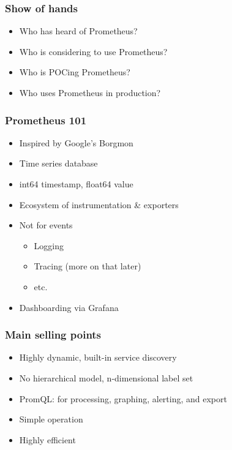 \documentclass[t]{beamer}
\begin{document}



\begin{frame}
	\frametitle{Show of hands}
	\begin{itemize}
		\item Who has heard of Prometheus?
		\item Who is considering to use Prometheus?
		\item Who is POCing Prometheus?
		\item Who uses Prometheus in production?
	\end{itemize}
\end{frame}

\begin{frame}
	\frametitle{Prometheus 101}
	\begin{itemize}
		\item Inspired by Google's Borgmon
		\item Time series database
		\item int64 timestamp, float64 value
		\item Ecosystem of instrumentation \& exporters
		\item Not for events
		\begin{itemize}
			\item Logging
			\item Tracing (more on that later)
			\item etc.
		\end{itemize}
		\item Dashboarding via Grafana
	\end{itemize}
\end{frame}

\begin{frame}
	\frametitle{Main selling points}
	\begin{itemize}
		\item Highly dynamic, built-in service discovery
		\item No hierarchical model, n-dimensional label set
		\item PromQL: for processing, graphing, alerting, and export
		\item Simple operation
		\item Highly efficient
	\end{itemize}
\end{frame}
\end{document}

